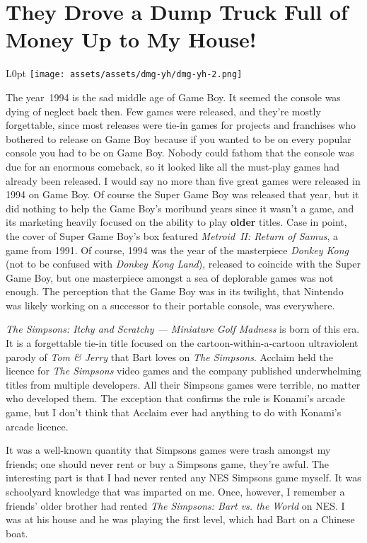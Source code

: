 \documentclass{book}
\begin{document}
\newpage\FloatBarrier\needspace{10mm}\section*{They Drove a Dump Truck Full of Money Up to My House!}\nopagebreak[4]
\begin{wrapfigure}{L}{0pt} \texttt{[image: assets/assets/dmg-yh/dmg-yh-2.png]}\end{wrapfigure}
The year 1994 is the sad middle age of Game Boy. It seemed the console was dying of neglect back then. Few games were released, and they’re mostly forgettable, since most releases were tie-in games for projects and franchises who bothered to release on Game Boy because if you wanted to be on every popular console you had to be on Game Boy. Nobody could fathom that the console was due for an enormous comeback, so it looked like all the must-play games had already been released. I would say no more than five great games were released in 1994 on Game Boy. Of course the Super Game Boy was released that year, but it did nothing to help the Game Boy’s moribund years since it wasn’t a game, and its marketing heavily focused on the ability to play \textbf{older} titles. Case in point, the cover of Super Game Boy’s box featured \emph{Metroid II: Return of Samus}, a game from 1991. Of course, 1994 was the year of the masterpiece \emph{Donkey Kong} (not to be confused with \emph{Donkey Kong Land}), released to coincide with the Super Game Boy, but one masterpiece amongst a sea of deplorable games was not enough. The perception that the Game Boy was in its twilight, that Nintendo was likely working on a successor to their portable console, was everywhere.

\emph{The Simpsons: Itchy and Scratchy — Miniature Golf Madness} is born of this era. It is a forgettable tie-in title focused on the cartoon-within-a-cartoon ultraviolent parody of \emph{Tom \& Jerry} that Bart loves on \emph{The Simpsons}. Acclaim held the licence for \emph{The Simpsons} video games and the company published underwhelming titles from multiple developers. All their Simpsons games were terrible, no matter who developed them. The exception that confirms the rule is Konami’s arcade game, but I don’t think that Acclaim ever had anything to do with Konami’s arcade licence.

It was a well-known quantity that Simpsons games were trash amongst my friends; one should never rent or buy a Simpsons game, they’re awful. The interesting part is that I had never rented any NES Simpsons game myself. It was schoolyard knowledge that was imparted on me. Once, however, I remember a friends’ older brother had rented \emph{The Simpsons: Bart vs. the World} on NES. I was at his house and he was playing the first level, which had Bart on a Chinese boat.
\end{document}
